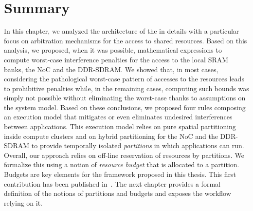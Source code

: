\documentclass[main.tex]{subfiles}
\begin{document}
\section{Summary}
In this chapter, we analyzed the architecture of the \mppalong in details with a particular focus on arbitration mechanisms for the access to shared resources. Based on this analysis, we proposed, when it was possible, mathematical expressions to compute worst-case interference penalties for the access to the local SRAM banks, the NoC and the DDR-SDRAM. We showed that, in most cases, considering the pathological worst-case pattern of accesses to the resources leads to prohibitive penalties while, in the remaining cases, computing such bounds was simply not possible without eliminating the worst-case thanks to assumptions on the system model. Based on these conclusions, we proposed four rules composing an execution model that mitigates or even eliminates undesired interferences between applications. This execution model relies on pure spatial partitioning inside compute clusters and on hybrid partitioning for the NoC and the DDR-SDRAM to provide temporally isolated \emph{partitions} in which applications can run. Overall, our approach relies on off-line reservation of resources by partitions. We formalize this using a notion of \emph{resource budget} that is allocated to a partition. Budgets are key elements for the framework proposed in this thesis. This first contribution has been published in~\cite{Perret16}. The next chapter provides a formal definition of the notions of partitions and budgets and exposes the workflow relying on it.



\clearpage
\subbiblio
\end{document}
